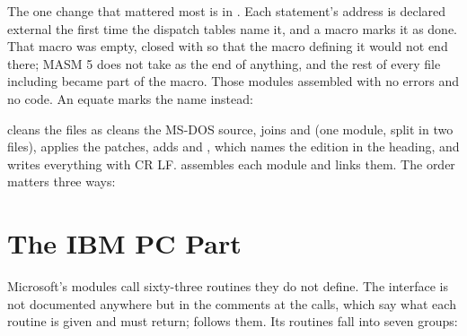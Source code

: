 The one change that mattered most is in . Each statement's
address is declared external the first time the dispatch tables name it,
and a macro marks it as done. That macro was empty, closed with
 so that the macro defining it would not end there; MASM 5
does not take  as the end of anything, and the rest of every
file including  became part of the macro. Those modules
assembled with no errors and no code. An equate marks the name instead:


 cleans the files as  cleans the
MS-DOS source, joins  and  (one module,
split in two files), applies the patches, adds  and
, which names the edition in the heading, and writes
everything with CR LF.  assembles each module
and links them. The order matters three ways:




\section{The IBM PC Part}

Microsoft's modules call sixty-three routines they do not define. The
interface is not documented anywhere but in the comments at the calls,
which say what each routine is given and must return; 
follows them. Its routines fall into seven groups:

